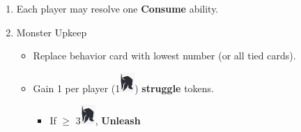 \documentclass[12pt]{article}
\newenvironment{enumerateCustom}
{\begin{enumerate}
  \setlength{\itemsep}{1pt}
  \setlength{\parskip}{0pt}
  \setlength{\parsep}{0pt}}
{\end{enumerate}}
\newenvironment{itemizeCustom}
{\begin{itemize}
  \setlength{\itemsep}{1pt}
  \setlength{\parskip}{0pt}
  \setlength{\parsep}{0pt}}
{\end{itemize}}
\begin{document}
\begin{mdframed}[style=SummaryCard, align=center, userdefinedwidth=40em, frametitle={Round Order Guide}]

    \begin{enumerateCustom}
        \item Each player may resolve one \textbf{Consume} ability.
        \item Monster Upkeep
            \begin{itemizeCustom}
                \item Replace behavior card with lowest number (or all tied cards).
                \item Gain 1 per player (1\includegraphics[scale=0.40]{images/per_player.png}) \textbf{struggle} tokens.
                    \begin{itemizeCustom}
                        \item If $\ge$ 3\includegraphics[scale=0.40]{images/per_player.png}, \textbf{Unleash}
                    \end{itemizeCustom}
            \end{itemizeCustom}


\end{enumerateCustom}
\end{mdframed}
\end{document}
